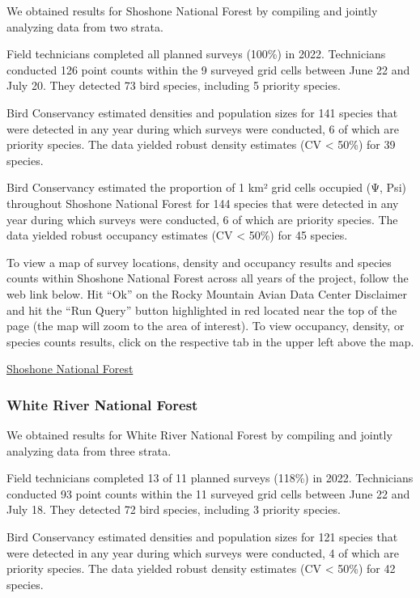 \documentclass[
  letterpaper,
  DIV=11,
  numbers=noendperiod,
  oneside]{scrreprt}
\begin{document}
We obtained results for Shoshone National Forest by compiling and
jointly analyzing data from two strata.

Field technicians completed all planned surveys (100\%) in 2022.
Technicians conducted 126 point counts within the 9 surveyed grid cells
between June 22 and July 20. They detected 73 bird species, including 5
priority species.

Bird Conservancy estimated densities and population sizes for 141
species that were detected in any year during which surveys were
conducted, 6 of which are priority species. The data yielded robust
density estimates (CV \textless{} 50\%) for 39 species.

Bird Conservancy estimated the proportion of 1 km² grid cells occupied
(Ψ, Psi) throughout Shoshone National Forest for 144 species that were
detected in any year during which surveys were conducted, 6 of which are
priority species. The data yielded robust occupancy estimates (CV
\textless{} 50\%) for 45 species.

To view a map of survey locations, density and occupancy results and
species counts within Shoshone National Forest across all years of the
project, follow the web link below. Hit ``Ok'' on the Rocky Mountain
Avian Data Center Disclaimer and hit the ``Run Query'' button
highlighted in red located near the top of the page (the map will zoom
to the area of interest). To view occupancy, density, or species counts
results, click on the respective tab in the upper left above the map.

\href{http://www.rmbo.org/new_site/adc/QueryWindow.aspx\#N4IgzgrgDgpgTmALnAhoiBbEAuABCAZQAsB7MUgOxlwDk0BLEilAG1wDES4YkQBfIA==}{Shoshone
National Forest}

\hypertarget{white-river-national-forest}{%
\subsubsection{White River National
Forest}\label{white-river-national-forest}}

We obtained results for White River National Forest by compiling and
jointly analyzing data from three strata.

Field technicians completed 13 of 11 planned surveys (118\%) in 2022.
Technicians conducted 93 point counts within the 11 surveyed grid cells
between June 22 and July 18. They detected 72 bird species, including 3
priority species.

Bird Conservancy estimated densities and population sizes for 121
species that were detected in any year during which surveys were
conducted, 4 of which are priority species. The data yielded robust
density estimates (CV \textless{} 50\%) for 42 species.
\end{document}
